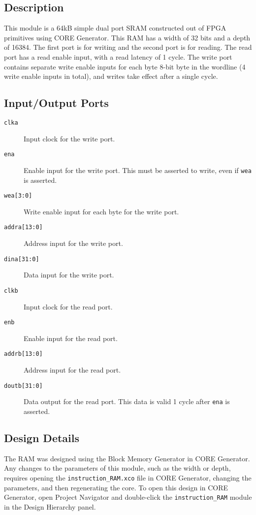 \subsection{Description}
This module is a 64kB simple dual port SRAM constructed out of FPGA primitives using CORE Generator. This RAM has a width of 32 bits and a depth of 16384. The first port is for writing and the second port is for reading. The read port has a read enable input, with a read latency of 1 cycle. The write port contains separate write enable inputs for each byte 8-bit byte in the wordline (4 write enable inputs in total), and writes take effect after a single cycle.

\subsection{Input/Output Ports}
\begin{description}
	\item[\texttt{clka}] Input clock for the write port.
	\item[\texttt{ena}] Enable input for the write port. This must be asserted to write, even if \texttt{wea} is asserted.
	\item[\texttt{wea[3:0]}] Write enable input for each byte for the write port.
	\item[\texttt{addra[13:0]}] Address input for the write port.
	\item[\texttt{dina[31:0]}] Data input for the write port.
	\item[\texttt{clkb}] Input clock for the read port.
	\item[\texttt{enb}] Enable input for the read port.
	\item[\texttt{addrb[13:0]}] Address input for the read port.
	\item[\texttt{doutb[31:0]}] Data output for the read port. This data is valid 1 cycle after \texttt{ena} is asserted.
\end{description}

\subsection{Design Details}
The RAM was designed using the Block Memory Generator in CORE Generator. Any changes to the parameters of this module, such as the width or depth, requires opening the \texttt{instruction\_RAM.xco} file in CORE Generator, changing the parameters, and then regenerating the core. To open this design in CORE Generator, open Project Navigator and double-click the \texttt{instruction\_RAM} module in the Design Hierarchy panel.

